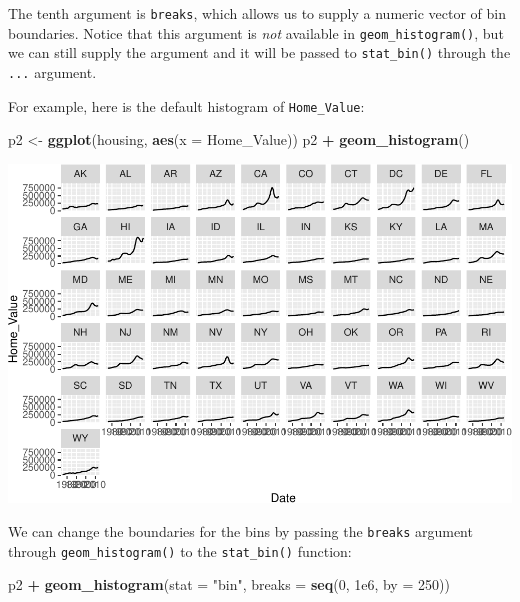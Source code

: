 \documentclass[
]{book}
\newenvironment{Shaded}{\begin{snugshade}}{\end{snugshade}}
\newcommand{\DataTypeTok}[1]{\textcolor[rgb]{0.13,0.29,0.53}{#1}}
\newcommand{\DecValTok}[1]{\textcolor[rgb]{0.00,0.00,0.81}{#1}}
\newcommand{\FloatTok}[1]{\textcolor[rgb]{0.00,0.00,0.81}{#1}}
\newcommand{\KeywordTok}[1]{\textcolor[rgb]{0.13,0.29,0.53}{\textbf{#1}}}
\newcommand{\NormalTok}[1]{#1}
\newcommand{\OperatorTok}[1]{\textcolor[rgb]{0.81,0.36,0.00}{\textbf{#1}}}
\newcommand{\StringTok}[1]{\textcolor[rgb]{0.31,0.60,0.02}{#1}}
\begin{document}
The tenth argument is \texttt{breaks}, which allows us to supply a numeric vector of bin boundaries. Notice that this argument is \emph{not} available in \texttt{geom\_histogram()}, but we can still supply the argument and it will be passed to \texttt{stat\_bin()} through the \texttt{...} argument.

For example, here is the default histogram of \texttt{Home\_Value}:

\begin{Shaded}
\begin{Highlighting}[]
\NormalTok{p2 \textless{}{-}}\StringTok{ }\KeywordTok{ggplot}\NormalTok{(housing, }\KeywordTok{aes}\NormalTok{(}\DataTypeTok{x =}\NormalTok{ Home\_Value))}
\NormalTok{p2 }\OperatorTok{+}\StringTok{ }\KeywordTok{geom\_histogram}\NormalTok{()}
\end{Highlighting}
\end{Shaded}

\includegraphics{R/Rgraphics/figures/unnamed-chunk-178-1.pdf}

We can change the boundaries for the bins by passing the \texttt{breaks} argument through \texttt{geom\_histogram()} to the \texttt{stat\_bin()} function:

\begin{Shaded}
\begin{Highlighting}[]
\NormalTok{p2 }\OperatorTok{+}\StringTok{ }\KeywordTok{geom\_histogram}\NormalTok{(}\DataTypeTok{stat =} \StringTok{"bin"}\NormalTok{, }\DataTypeTok{breaks =} \KeywordTok{seq}\NormalTok{(}\DecValTok{0}\NormalTok{, }\FloatTok{1e6}\NormalTok{, }\DataTypeTok{by =} \DecValTok{250}\NormalTok{))}
\end{Highlighting}
\end{Shaded}
\end{document}
